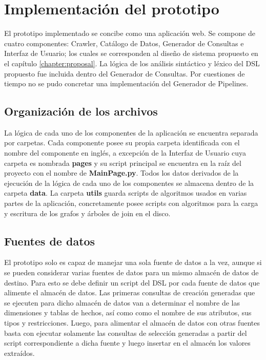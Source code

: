 \section{Implementación del prototipo}\label{section:prototype}

El prototipo implementado se concibe como una aplicación web. Se compone de cuatro componentes: Crawler, Catálogo de Datos, Generador de Consultas 
e Interfaz de Usuario; los cuales se corresponden al diseño de sistema propuesto en el capítulo \ref{chapter:proposal}. 
La lógica de los análisis sintáctico y léxico del DSL propuesto fue incluida dentro del Generador de Consultas. 
Por cuestiones de tiempo no se pudo concretar una implementación del Generador de Pipelines.

\subsection{Organización de los archivos}

La lógica de cada uno de los componentes de la aplicación se encuentra separada por carpetas. Cada componente 
posee su propia carpeta identificada con el nombre del componente en inglés, a excepción de la Interfaz de Usuario 
cuya carpeta es nombrada \textbf{pages} y su script principal se encuentra en la raíz del proyecto con el nombre de 
\textbf{MainPage.py}. Todos los datos derivados de la ejecución de la lógica de cada uno de los componentes 
se almacena dentro de la carpeta \textbf{data}. La carpeta \textbf{utils} guarda scripts de algoritmos usados 
en varias partes de la aplicación, concretamente posee scripts con algoritmos para la carga y escritura de los 
grafos y \'arboles de join en el disco.

\subsection{Fuentes de datos}

El prototipo solo es capaz de manejar una sola fuente de datos a la vez, aunque si se pueden considerar varias 
fuentes de datos para un mismo almacén de datos de destino. Para esto se debe definir un script del DSL por 
cada fuente de datos que alimente el almacén de datos. Las primeras consultas de creación generadas que se ejecuten 
para dicho almacén de datos van a determinar el nombre de las dimensiones y tablas de hechos, as\'i como 
como el nombre de sus atributos, sus tipos y restricciones. Luego, para alimentar el almacén de datos con otras 
fuentes basta con ejecutar solamente las consultas de selección generadas a partir del script correspondiente a 
dicha fuente y luego insertar en el almacén los valores extra\'idos.

